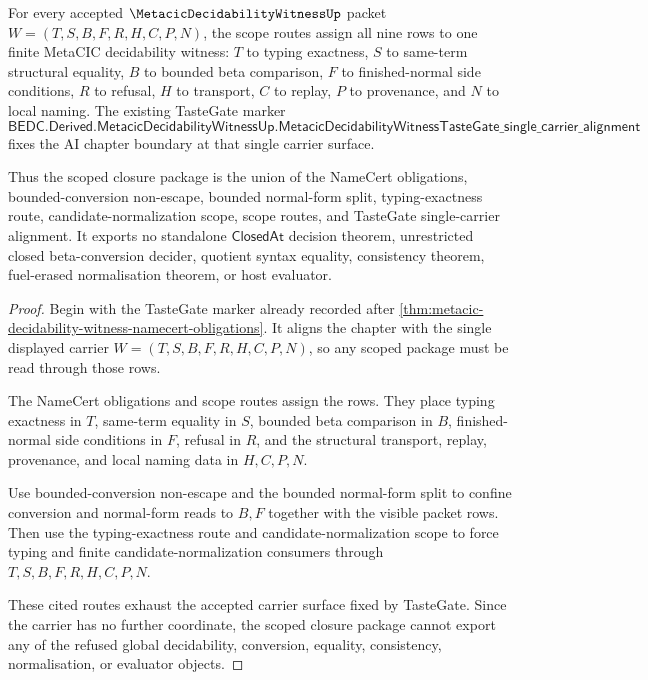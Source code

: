 \begin{theorem}
\label{thm:metacic-decidability-witness-scoped-closure-package}
For every accepted $\MetacicDecidabilityWitnessUp$ packet $W=(T,S,B,F,R,H,C,P,N)$, the scope routes assign all nine rows to one finite MetaCIC decidability witness: $T$ to typing exactness, $S$ to same-term structural equality, $B$ to bounded beta comparison, $F$ to finished-normal side conditions, $R$ to refusal, $H$ to transport, $C$ to replay, $P$ to provenance, and $N$ to local naming. The existing TasteGate marker
$$
\mathsf{BEDC.Derived.MetacicDecidabilityWitnessUp.MetacicDecidabilityWitnessTasteGate\_single\_carrier\_alignment}
$$
fixes the AI chapter boundary at that single carrier surface.

Thus the scoped closure package is the union of the NameCert obligations, bounded-conversion non-escape, bounded normal-form split, typing-exactness route, candidate-normalization scope, scope routes, and TasteGate single-carrier alignment. It exports no standalone $\mathsf{ClosedAt}$ decision theorem, unrestricted closed beta-conversion decider, quotient syntax equality, consistency theorem, fuel-erased normalisation theorem, or host evaluator.
\end{theorem}
\begin{proof}
Begin with the TasteGate marker already recorded after \autoref{thm:metacic-decidability-witness-namecert-obligations}. It aligns the chapter with the single displayed carrier $W=(T,S,B,F,R,H,C,P,N)$, so any scoped package must be read through those rows.

The NameCert obligations and scope routes assign the rows. They place typing exactness in $T$, same-term equality in $S$, bounded beta comparison in $B$, finished-normal side conditions in $F$, refusal in $R$, and the structural transport, replay, provenance, and local naming data in $H,C,P,N$.

Use bounded-conversion non-escape and the bounded normal-form split to confine conversion and normal-form reads to $B,F$ together with the visible packet rows. Then use the typing-exactness route and candidate-normalization scope to force typing and finite candidate-normalization consumers through $T,S,B,F,R,H,C,P,N$.

These cited routes exhaust the accepted carrier surface fixed by TasteGate. Since the carrier has no further coordinate, the scoped closure package cannot export any of the refused global decidability, conversion, equality, consistency, normalisation, or evaluator objects.
\end{proof}

